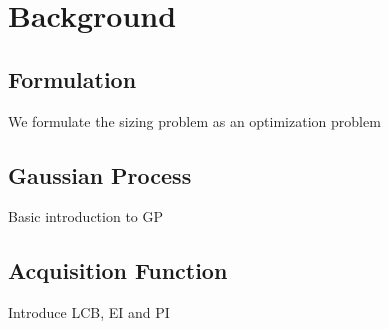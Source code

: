 \section{Background}

\subsection{Formulation}

We formulate the sizing problem as an optimization problem

\subsection{Gaussian Process}

Basic introduction to GP

\subsection{Acquisition Function}

Introduce LCB, EI and PI
